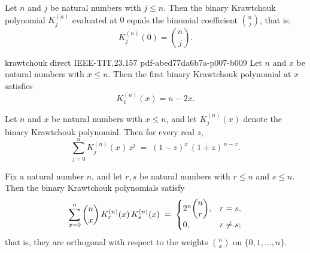 \begin{theorem}
\label{krawtchouk_eval_zero}
\leanok
{}
Let $n$ and $j$ be natural numbers with $j \le n$. Then the binary Krawtchouk polynomial
$K_j^{(n)}$ evaluated at $0$ equals the binomial coefficient $\binom{n}{j}$, that is,
\[
  K_j^{(n)}(0) = \binom{n}{j}.
\]
\end{theorem}

\begin{theorem}
\label{krawtchouk_one}
\leanok
{}
\proofstep
  {krawtchouk}
  {direct}
  {IEEE-TIT.23.157}
  {pdf-abed77da6b7a-p007-b009}
Let $n$ and $x$ be natural numbers with $x \le n$. Then the first binary Krawtchouk
polynomial at $x$ satisfies
\[
  K_1^{(n)}(x) = n - 2x.
\]
\end{theorem}

\begin{theorem}
\label{krawtchouk_generating_function}
\leanok
{}
Let $n$ and $x$ be natural numbers with $x \le n$, and let $K_j^{(n)}(x)$ denote the
binary Krawtchouk polynomial. Then for every real $z$,
\[
  \sum_{j=0}^{n} K_j^{(n)}(x)\, z^{j} \;=\; (1-z)^{x}\,(1+z)^{\,n-x}.
\]
\end{theorem}

\begin{theorem}
\label{krawtchouk_orthogonality}
\leanok
{}
Fix a natural number $n$, and let $r, s$ be natural numbers with $r \le n$ and $s \le
n$. Then the binary Krawtchouk polynomials satisfy
\[
  \sum_{x=0}^{n} \binom{n}{x}\, K_r^{(n)}(x)\, K_s^{(n)}(x)
  \;=\;
  \begin{cases}
    2^{n}\dbinom{n}{r}, & r = s,\\[2pt]
    0, & r \ne s;
  \end{cases}
\]
that is, they are orthogonal with respect to the weights $\binom{n}{x}$ on $\{0, 1,
\dots, n\}$.
\end{theorem}

